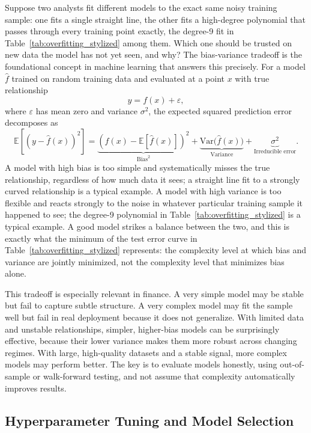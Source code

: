 \documentclass[../ai_in_finance]{subfiles}
\begin{document}
Suppose two analysts fit different models to the exact same noisy training sample: one fits a single straight line, the other fits a high-degree polynomial that passes through every training point exactly, the degree-9 fit in Table~\ref{tab:overfitting_stylized} among them. Which one should be trusted on new data the model has not yet seen, and why? The bias-variance tradeoff is the foundational concept in machine learning that answers this precisely. For a model $\hat f$ trained on random training data and evaluated at a point $x$ with true relationship
$$y = f(x) + \varepsilon,$$
where $\varepsilon$ has mean zero and variance $\sigma^2$, the expected squared prediction error decomposes as
\begin{equation*}
\mathbb{E}\left[(y - \hat f(x))^2\right] = \underbrace{\left(f(x) - \mathbb{E}[\hat f(x)]\right)^2}_{\text{Bias}^2} + \underbrace{\text{Var}\big(\hat f(x)\big)}_{\text{Variance}} + \underbrace{\sigma^2}_{\text{Irreducible error}}.
\end{equation*}
A model with high bias is too simple and systematically misses the true relationship, regardless of how much data it sees; a straight line fit to a strongly curved relationship is a typical example. A model with high variance is too flexible and reacts strongly to the noise in whatever particular training sample it happened to see; the degree-9 polynomial in Table~\ref{tab:overfitting_stylized} is a typical example. A good model strikes a balance between the two, and this is exactly what the minimum of the test error curve in Table~\ref{tab:overfitting_stylized} represents: the complexity level at which bias and variance are jointly minimized, not the complexity level that minimizes bias alone.

This tradeoff is especially relevant in finance. A very simple model may be stable but fail to capture subtle structure. A very complex model may fit the sample well but fail in real deployment because it does not generalize. With limited data and unstable relationships, simpler, higher-bias models can be surprisingly effective, because their lower variance makes them more robust across changing regimes. With large, high-quality datasets and a stable signal, more complex models may perform better. The key is to evaluate models honestly, using out-of-sample or walk-forward testing, and not assume that complexity automatically improves results.

\subsection{Hyperparameter Tuning and Model Selection}
\end{document}
